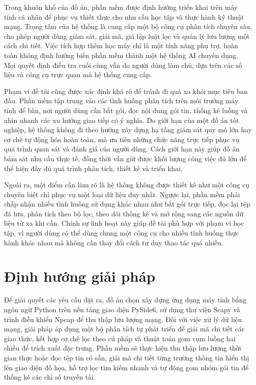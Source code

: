 \documentclass[../DoAn.tex]{subfiles}
\begin{document}
Trong khuôn khổ của đồ án, phần mềm được định hướng triển khai trên máy tính cá nhân để phục vụ thiết thực cho nhu cầu học tập và thực hành kỹ thuật mạng. Trọng tâm của hệ thống là cung cấp một bộ công cụ phân tích chuyên sâu, cho phép người dùng giám sát, giải mã, giả lập luật lọc và quản lý lưu lượng một cách chi tiết. Việc tích hợp thêm học máy chỉ là một tính năng phụ trợ, hoàn toàn không định hướng biến phần mềm thành một hệ thống AI chuyên dụng. Mọi quyết định điều tra cuối cùng vẫn do người dùng làm chủ, dựa trên các số liệu và công cụ trực quan mà hệ thống cung cấp.

Phạm vi đề tài cũng được xác định khá rõ để tránh đi quá xa khỏi mục tiêu ban đầu. Phần mềm tập trung vào các tình huống phân tích trên môi trường máy tính để bàn, nơi người dùng cần bắt gói, đọc nội dung gói tin, thống kê luồng và nhìn nhanh các xu hướng giao tiếp có ý nghĩa. Do giới hạn của một đồ án tốt nghiệp, hệ thống không đi theo hướng xây dựng hạ tầng giám sát quy mô lớn hay cơ chế tự động hóa hoàn toàn, mà ưu tiên những chức năng trực tiếp phục vụ quá trình quan sát và đánh giá của người dùng. Cách giới hạn này giúp đồ án bám sát nhu cầu thực tế, đồng thời vẫn giữ được khối lượng công việc đủ lớn để thể hiện đầy đủ quá trình phân tích, thiết kế và triển khai.

Ngoài ra, một điểm cần làm rõ là hệ thống không được thiết kế như một công cụ chuyên biệt chỉ phục vụ một loại dữ liệu duy nhất. Ngược lại, phần mềm phải chấp nhận nhiều tình huống sử dụng khác nhau như bắt gói trực tiếp, đọc lại tệp đã lưu, phân tích theo bộ lọc, theo dõi thống kê và mở rộng sang các nguồn dữ liệu từ xa khi cần. Chính sự linh hoạt này giúp đề tài phù hợp với phạm vi học tập, vì người dùng có thể dùng chung một công cụ cho nhiều tình huống thực hành khác nhau mà không cần thay đổi cách tư duy thao tác quá nhiều.

\section{Định hướng giải pháp}
Để giải quyết các yêu cầu đặt ra, đồ án chọn xây dựng ứng dụng máy tính bằng ngôn ngữ Python trên nền tảng giao diện PySide6, sử dụng thư viện Scapy và trình điều khiển Npcap để thu thập lưu lượng mạng. Đối với việc xử lý dữ liệu mạng, giải pháp áp dụng một bộ phân tích tự phát triển để giải mã chi tiết các giao thức, kết hợp cơ chế lọc theo cú pháp và thuật toán gom cụm luồng hai chiều để trích xuất đặc trưng. Phần mềm sẽ thực hiện thu thập lưu lượng thời gian thực hoặc đọc tệp tin có sẵn, giải mã chi tiết từng trường thông tin hiển thị lên giao diện đồ họa, hỗ trợ lọc tìm kiếm nhanh và tự động gom nhóm gói tin để thống kê các chỉ số truyền tải.
\end{document}

